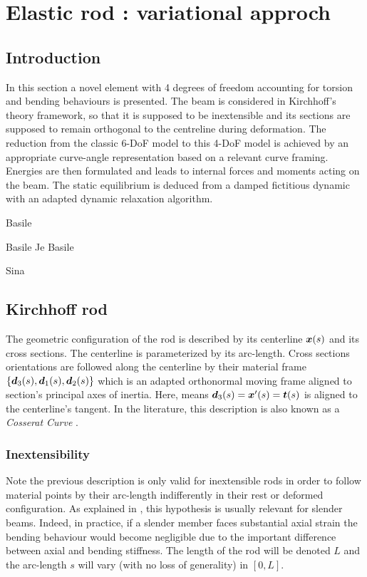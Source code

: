 \chapter{Elastic rod : variational approch}

\section{Introduction}

In this section a novel element with 4 degrees of freedom accounting for torsion and bending behaviours is presented. The beam is considered in Kirchhoff’s theory framework, so that it is supposed to be inextensible and its sections are supposed to remain orthogonal to the centreline during deformation. The reduction from the classic 6-DoF model to this 4-DoF model is achieved by an appropriate curve-angle representation based on a relevant curve framing. Energies are then formulated and leads to internal forces and moments acting on the beam. The static equilibrium is deduced from a damped fictitious dynamic with an adapted dynamic relaxation algorithm.

Basile \cite{Bergou2010}

Basile \cite{Bergou2008}
Je
Basile \cite{Audoly2000}

Sina \cite{Nabei2014}


\section{Kirchhoff rod}
The geometric configuration of the rod is described by its centerline $\boldsymbol{x}(s)$ and its cross sections. The centerline is parameterized by its arc-length. Cross sections orientations are followed along the centerline by their material frame $\{\boldsymbol{d}_3 (s),\boldsymbol{d}_1 (s),\boldsymbol{d}_2 (s)\}$ which is an adapted orthonormal moving frame aligned to section’s principal axes of inertia. Here,  means $\boldsymbol{d}_3 (s)=\boldsymbol{x}'(s)=\boldsymbol{t}(s)$ is aligned to the centerline’s tangent. In the literature, this description is also known as a \emph{Cosserat Curve} \note{[ref]}.

\subsection{Inextensibility}
Note the previous description is only valid for inextensible rods in order to follow material points by their arc-length indifferently in their rest or deformed configuration. As explained in \cite{Audoly2010}, this hypothesis is usually relevant for slender beams. Indeed, in practice, if a slender member faces substantial axial strain the bending behaviour would become negligible due to the important difference between axial and bending stiffness. The length of the rod will be denoted $L$ and the arc-length $s$ will vary (with no loss of generality) in $[0,L]$.


